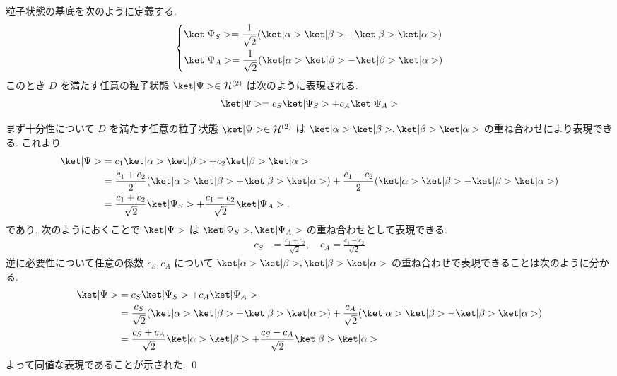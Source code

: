 \documentclass[uplatex,dvipdfmx,a4paper,11pt]{jlreq}
\makeatletter
\newcommand{\HH}{\mathcal{H}}
\numberwithin{equation}{section}
\theoremstyle{definition}
\renewenvironment{proof}[1][\proofname]{\par
  \normalfont
  \topsep6\p@\@plus6\p@ \trivlist
  \item[\hskip\labelsep{\bfseries #1}\@addpunct{\bfseries}]\ignorespaces\quad\par
}{%
  \qed\endtrivlist\@endpefalse
}
\renewcommand\proofname{証明}
\makeatother
\begin{document}
\begin{proposition}[Q21-1(ii)]
  粒子状態の基底を次のように定義する.
  \begin{align}
    \begin{dcases}
      \ket|\Psi_S> = \frac{1}{\sqrt{2}}(\ket|\alpha>\ket|\beta> + \ket|\beta>\ket|\alpha>) \\
      \ket|\Psi_A> = \frac{1}{\sqrt{2}}(\ket|\alpha>\ket|\beta> - \ket|\beta>\ket|\alpha>)
    \end{dcases}
  \end{align}
  このとき $D$ を満たす任意の粒子状態 $\ket|\Psi>\in\HH^{(2)}$ は次のように表現される.
  \begin{align}
    \ket|\Psi> = c_S\ket|\Psi_S> + c_A\ket|\Psi_A>
  \end{align}
\end{proposition}
\begin{proof}
  まず十分性について $D$ を満たす任意の粒子状態 $\ket|\Psi>\in\HH^{(2)}$ は $\ket|\alpha>\ket|\beta>, \ket|\beta>\ket|\alpha>$ の重ね合わせにより表現できる. これより
  \begin{align}
    \ket|\Psi> & = c_1\ket|\alpha>\ket|\beta> + c_2\ket|\beta>\ket|\alpha>                                                                                         \\
               & = \frac{c_1 + c_2}{2}(\ket|\alpha>\ket|\beta> + \ket|\beta>\ket|\alpha>) + \frac{c_1 - c_2}{2}(\ket|\alpha>\ket|\beta> - \ket|\beta>\ket|\alpha>) \\
               & = \frac{c_1 + c_2}{\sqrt{2}}\ket|\Psi_S> + \frac{c_1 - c_2}{\sqrt{2}}\ket|\Psi_A>.
  \end{align}
  であり, 次のようにおくことで $\ket|\Psi>$ は $\ket|\Psi_S>, \ket|\Psi_A>$ の重ね合わせとして表現できる.
  \begin{align}
    c_S & = \frac{c_1 + c_2}{\sqrt{2}}, \quad c_A = \frac{c_1 - c_2}{\sqrt{2}}
  \end{align}
  逆に必要性について任意の係数 $c_S, c_A$ について $\ket|\alpha>\ket|\beta>, \ket|\beta>\ket|\alpha>$ の重ね合わせで表現できることは次のように分かる.
  \begin{align}
    \ket|\Psi> & = c_S\ket|\Psi_S> + c_A\ket|\Psi_A>                                                                                                                 \\
               & = \frac{c_S}{\sqrt{2}}(\ket|\alpha>\ket|\beta> + \ket|\beta>\ket|\alpha>) + \frac{c_A}{\sqrt{2}}(\ket|\alpha>\ket|\beta> - \ket|\beta>\ket|\alpha>) \\
               & = \frac{c_S + c_A}{\sqrt{2}}\ket|\alpha>\ket|\beta> + \frac{c_S - c_A}{\sqrt{2}}\ket|\beta>\ket|\alpha>
  \end{align}
  よって同値な表現であることが示された.
\end{proof}
\end{document}
